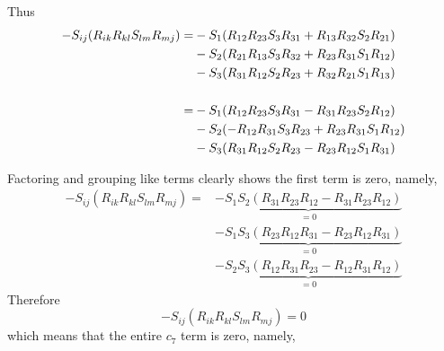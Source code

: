 Thus
\begin{subequations}
    \begin{align}
            -S_{ij}(R_{ik}R_{kl} S_{lm} R_{mj})   = &
                    -S_{1}  (R_{12} R_{23} S_{3} R_{31}   + R_{13} R_{32} S_{2} R_{21})      \notag \\
                &   -S_{2}  (R_{21} R_{13} S_{3} R_{32}   + R_{23} R_{31} S_{1} R_{12})             \\  
                &   -S_{3}  (R_{31} R_{12} S_{2} R_{23}   + R_{32} R_{21} S_{1} R_{13})      \notag \\  
                \notag \\
                = &
                    -S_{1}  (R_{12} R_{23} S_{3} R_{31}   - R_{31} R_{23} S_{2} R_{12})      \notag \\
                &   -S_{2}  (-R_{12} R_{31} S_{3} R_{23}  + R_{23} R_{31} S_{1} R_{12})             \\  
                &   -S_{3}  (R_{31} R_{12} S_{2} R_{23}   - R_{23} R_{12} S_{1} R_{31})     \notag   
    \end{align}
\end{subequations}

Factoring and grouping like terms clearly shows the first term is zero, namely,
    \begin{equation}
        \begin{split}
         -S_{ij}(R_{ik}R_{kl} S_{lm} R_{mj})   = &
                \underbrace{-S_{1}S_{2}(R_{31}R_{23}R_{12} - R_{31}R_{23}R_{12})}_{=0}    \\
            &   \underbrace{-S_{1}S_{3}(R_{23}R_{12}R_{31} - R_{23}R_{12}R_{31})}_{=0}    \\
            &   \underbrace{-S_{2}S_{3}(R_{12}R_{31}R_{23} - R_{12}R_{31}R_{12})}_{=0}
        \end{split}
    \end{equation}
Therefore
\begin{equation}
    -S_{ij}(R_{ik}R_{kl} S_{lm} R_{mj}) = 0
\end{equation}
which means that the entire $c_{7} $ term is zero, namely,

